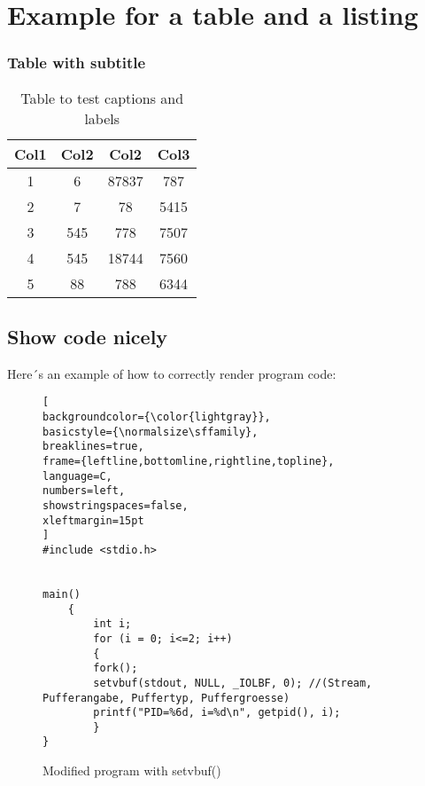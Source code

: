 

\chapter{Example for a table and a listing}



\subsection{Table with subtitle}

\begin{table}[h!]
\centering
\begin{tabular}{||c c c c||} 
 \hline
 Col1 & Col2 & Col2 & Col3 \\ [0.5ex] 
 \hline\hline
 1 & 6 & 87837 & 787 \\ 
 2 & 7 & 78 & 5415 \\
 3 & 545 & 778 & 7507 \\
 4 & 545 & 18744 & 7560 \\
 5 & 88 & 788 & 6344 \\ [1ex] 
 \hline
\end{tabular}
\caption{Table to test captions and labels}
\label{table:1}
\end{table}



\section{Show code nicely}

Here´s an example of how to correctly render program code:

\begin{figure}[h]
\begin{lstlisting}[
backgroundcolor={\color{lightgray}},
basicstyle={\normalsize\sffamily},
breaklines=true,
frame={leftline,bottomline,rightline,topline},
language=C,
numbers=left,
showstringspaces=false,
xleftmargin=15pt
]
#include <stdio.h> 


main() 
	{
        int i;
        for (i = 0; i<=2; i++)
        {
        fork();
        setvbuf(stdout, NULL, _IOLBF, 0); //(Stream, Pufferangabe, Puffertyp, Puffergroesse)
        printf("PID=%6d, i=%d\n", getpid(), i);
        }
} 
\end{lstlisting}


\protect\caption{Modified program with setvbuf()}
\end{figure}

